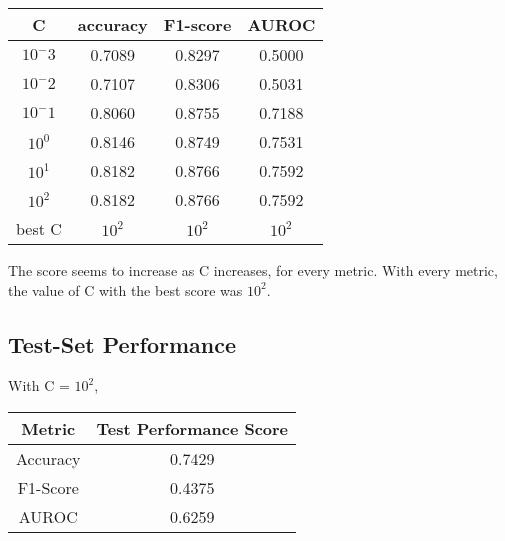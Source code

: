 \documentclass[11pt]{article}
\begin{document}
\begin{center}
\begin{tabular}{ |c|c|c|c| } 
 \hline
 C & accuracy & F1-score & AUROC\\ 
 \hline
 $10^-3$ & 0.7089 & 0.8297 & 0.5000 \\
 $10^-2$ & 0.7107 & 0.8306 & 0.5031 \\
 $10^-1$ & 0.8060 & 0.8755 & 0.7188 \\
 $10^0$  & 0.8146 & 0.8749 & 0.7531 \\
 $10^1$  & 0.8182 & 0.8766 & 0.7592 \\
 $10^2$  & 0.8182 & 0.8766 & 0.7592 \\
 \hline
 best C & $10^2$ & $10^2$ & $10^2$ \\
 \hline
\end{tabular}
\end{center}

The score seems to increase as C increases, for every metric. With every metric, the value of C with the best score was $10^2$.

\subsection{Test-Set Performance}
With C = $10^2$,
\begin{center}
\begin{tabular}{ |c|c| } 
 \hline
 Metric & Test Performance Score\\ 
 \hline
 Accuracy & 0.7429 \\
 \hline
 F1-Score & 0.4375 \\
 \hline
 AUROC & 0.6259 \\
 \hline
\end{tabular}
\end{center}
\end{document}
